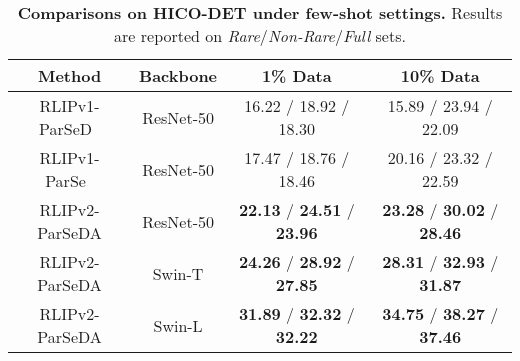 {\renewcommand{\arraystretch}{0.9}
\begin{table}[t]
\scriptsize
  \setlength{\tabcolsep}{4pt}
  \centering
    \begin{tabular}{c|c|c|c}
    \toprule
    \textbf{Method} & \textbf{Backbone} & \textbf{1\% Data} & \textbf{10\% Data} \\
    \midrule
    \midrule
    RLIPv1-ParSeD~\cite{Yuan2022RLIP} & ResNet-50 & 16.22 / 18.92 / 18.30 & 15.89 / 23.94 / 22.09 \\
    RLIPv1-ParSe~\cite{Yuan2022RLIP} & ResNet-50 & 17.47 / 18.76 / 18.46 & 20.16 / 23.32 / 22.59 \\
    \midrule
    RLIPv2-ParSeDA & ResNet-50 & \textbf{22.13} / \textbf{24.51} / \textbf{23.96} & \textbf{23.28} / \textbf{30.02} / \textbf{28.46} \\
    RLIPv2-ParSeDA & Swin-T & \textbf{24.26} / \textbf{28.92} / \textbf{27.85} & \textbf{28.31} / \textbf{32.93} / \textbf{31.87} \\
    RLIPv2-ParSeDA & Swin-L & \textbf{31.89} / \textbf{32.32} / \textbf{32.22} & \textbf{34.75} / \textbf{38.27} / \textbf{37.46} \\
\bottomrule
    \end{tabular}
    \vspace{-.1cm}
    \caption{\small \textbf{Comparisons on HICO-DET under few-shot settings.} Results are reported on \textit{Rare}/\textit{Non-Rare}/\textit{Full} sets. 
}
    \vspace{-.2cm}
  \label{tab:few-shot_transfer}
\end{table}}

